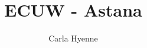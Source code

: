 \documentclass{article}
\title{ECUW - Astana}
\author{Carla Hyenne}
\begin{document}
\maketitle

\tableofcontents

\pagebreak
\end{document}
